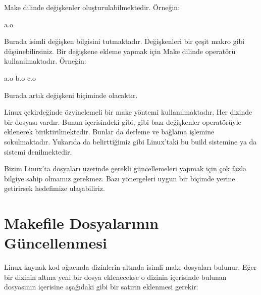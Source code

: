 \documentclass[a4paper,10pt,turkish]{sphinxmanual}
\begin{document}
\sphinxAtStartPar
Make dilinde değişkenler oluşturulabilmektedir. Örneğin:

\begin{sphinxVerbatim}[commandchars=\\\{\}]
a.o
\end{sphinxVerbatim}

\sphinxAtStartPar
Burada  isimli değişken  bilgisini tutmaktadır. Değişkenleri bir çeşit makro gibi
düşünebilirsiniz. Bir değişkene ekleme yapmak için Make dilinde \sphinxcode{\sphinxupquote{+=}} operatörü kullanılmaktadır. Örneğin:

\begin{sphinxVerbatim}[commandchars=\\\{\}]
a.o
b.o
c.o
\end{sphinxVerbatim}

\sphinxAtStartPar
Burada artık  değişkeni  biçiminde olacaktır.

\sphinxAtStartPar
Linux çekirdeğinde özyinelemeli bir make yöntemi kullanılmaktadır. Her dizinde bir  dosyası
vardır. Bunun içerisindeki  gibi,  gibi bazı değişkenler \sphinxcode{\sphinxupquote{+=}} operatörüyle eklenerek
biriktirilmektedir. Bunlar da derleme ve bağlama işlemine sokulmaktadır. Yukarıda da belirttiğimiz gibi
Linux’taki bu build sistemine  ya da  sistemi denilmektedir.

\sphinxAtStartPar
Bizim Linux’ta  dosyaları üzerinde gerekli güncellemeleri yapmak için çok fazla bilgiye sahip
olmamız gerekmez. Bazı yönergeleri uygun bir biçimde yerine getirirsek hedefimize ulaşabiliriz.


\section{Makefile Dosyalarının Güncellenmesi}
\label{\detokenize{kernelcompilation:makefile-dosyalarinin-guncellenmesi}}
\sphinxAtStartPar
Linux kaynak kod ağacında dizinlerin altında  isimli make dosyaları bulunur. Eğer bir dizinin
altına yeni bir dosya eklenecekse o dizinin içerisinde bulunan  dosyasının içerisine aşağıdaki
gibi bir satırın eklenmesi gerekir:
\end{document}
